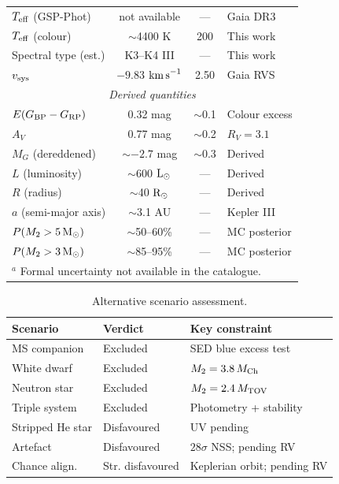 \documentclass[usenatbib,fleqn]{mnras}
\newcommand{\Msun}{{\rm M}_\odot}
\newcommand{\Lsun}{{\rm L}_\odot}
\newcommand{\Rsun}{{\rm R}_\odot}
\newcommand{\kms}{{\rm km\,s}^{-1}}
\begin{document}
\begin{table}
\begin{tabular}{lccl}
$T_{\rm eff}$ (GSP-Phot)   & not available    & ---      & Gaia DR3 \\
$T_{\rm eff}$ (colour)     & $\sim$4400 K     & 200      & This work \\
Spectral type (est.)       & K3--K4 III       & ---      & This work \\
$v_{\rm sys}$              & $-9.83$ $\kms$   & 2.50     & Gaia RVS \\
\midrule
\multicolumn{4}{c}{\textit{Derived quantities}} \\
$E(G_{\rm BP} - G_{\rm RP})$ & 0.32 mag       & $\sim$0.1 & Colour excess \\
$A_V$                  & 0.77 mag             & $\sim$0.2 & $R_V = 3.1$ \\
$M_G$ (dereddened)     & $\sim$$-2.7$ mag     & $\sim$0.3 & Derived \\
$L$ (luminosity)       & $\sim$600 $\Lsun$    & ---      & Derived \\
$R$ (radius)           & $\sim$40 $\Rsun$     & ---      & Derived \\
$a$ (semi-major axis)  & $\sim$3.1 AU         & ---      & Kepler III \\
$P(M_2 > 5\,\Msun)$   & $\sim$50--60\%       & ---      & MC posterior \\
$P(M_2 > 3\,\Msun)$   & $\sim$85--95\%       & ---      & MC posterior \\
\bottomrule
\multicolumn{4}{l}{$^a$ Formal uncertainty not available in the catalogue.}\\
\end{tabular}
\end{table}

\begin{table}
\centering
\caption{Alternative scenario assessment.}
\label{tab:scenarios}
\begin{tabular}{lll}
\toprule
Scenario & Verdict & Key constraint \\
\midrule
MS companion    & Excluded     & SED blue excess test \\
White dwarf     & Excluded     & $M_2 = 3.8\,M_{\rm Ch}$ \\
Neutron star    & Excluded     & $M_2 = 2.4\,M_{\rm TOV}$ \\
Triple system   & Excluded     & Photometry + stability \\
Stripped He star & Disfavoured & UV pending \\
Artefact        & Disfavoured  & $28\sigma$ NSS; pending RV \\
Chance align.   & Str. disfavoured & Keplerian orbit; pending RV \\
\bottomrule
\end{tabular}
\end{table}
\end{document}
